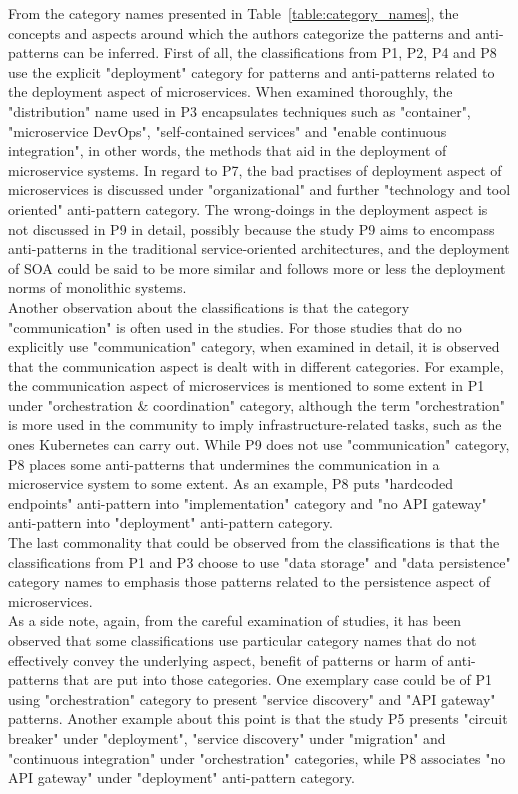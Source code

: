 \documentclass{Configuration_Files/PoliMi3i_thesis}
\begin{document}
From the category names presented in Table~\ref{table:category_names}, the concepts and aspects around which the authors categorize the patterns and anti-patterns can be inferred.
First of all, the classifications from P1, P2, P4 and P8 use the explicit "deployment" category for patterns and anti-patterns related to the deployment aspect of microservices.
When examined thoroughly, the "distribution" name used in P3 encapsulates techniques such as "container", "microservice DevOps", "self-contained services" and "enable continuous integration", in other words, the methods that aid in the deployment of microservice systems.
In regard to P7, the bad practises of deployment aspect of microservices is discussed under "organizational" and further "technology and tool oriented" anti-pattern category.
The wrong-doings in the deployment aspect is not discussed in P9 in detail, possibly because the study P9 aims to encompass anti-patterns in the traditional service-oriented architectures, and the deployment of SOA could be said to be more similar and follows more or less the deployment norms of monolithic systems.
\\
Another observation about the classifications is that the category "communication" is often used in the studies.
For those studies that do no explicitly use "communication" category, when examined in detail, it is observed that the communication aspect is dealt with in different categories.
For example, the communication aspect of microservices is mentioned to some extent in P1 under "orchestration \& coordination" category, although the term "orchestration" is more used in the community to imply infrastructure-related tasks, such as the ones Kubernetes can carry out.
While P9 does not use "communication" category, P8 places some anti-patterns that undermines the communication in a microservice system to some extent.
As an example, P8 puts "hardcoded endpoints" anti-pattern into "implementation" category and "no API gateway" anti-pattern into "deployment" anti-pattern category.
\\
The last commonality that could be observed from the classifications is that the classifications from P1 and P3 choose to use "data storage" and "data persistence" category names to emphasis those patterns related to the persistence aspect of microservices.
\\
As a side note, again, from the careful examination of studies, it has been observed that some classifications use particular category names that do not effectively convey the underlying aspect, benefit of patterns or harm of anti-patterns that are put into those categories. 
One exemplary case could be of P1 using "orchestration" category to present "service discovery" and "API gateway" patterns.
Another example about this point is that the study P5 presents "circuit breaker" under "deployment", "service discovery" under "migration" and "continuous integration" under "orchestration" categories, while P8 associates "no API gateway" under "deployment" anti-pattern category.
\end{document}
